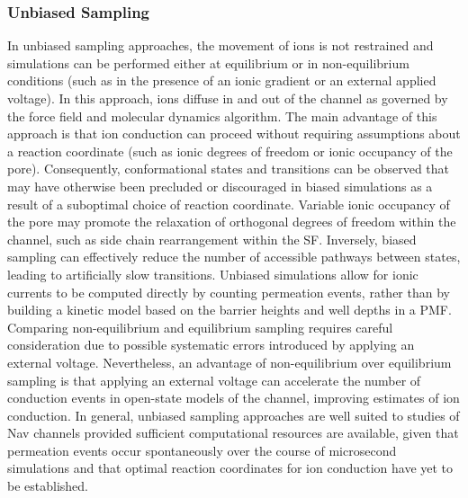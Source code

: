 \begin{refsection}
 \subsubsection{Unbiased Sampling}
 In unbiased sampling approaches, the movement of ions is not restrained and simulations can be performed either at equilibrium or in non-equilibrium conditions (such as in the presence of an ionic gradient or an external applied voltage).  In this approach, ions diffuse in and out of the channel as governed by the force field and molecular dynamics algorithm.  The main advantage of this approach is that ion conduction can proceed without requiring assumptions about a reaction coordinate (such as ionic degrees of freedom or ionic occupancy of the pore).  Consequently, conformational states and transitions can be observed that may have otherwise been precluded or discouraged in biased simulations as a result of a suboptimal choice of reaction coordinate.  Variable ionic occupancy of the pore may promote the relaxation of orthogonal degrees of freedom within the channel, such as side chain rearrangement within the SF.  Inversely, biased sampling can effectively reduce the number of accessible pathways between states, leading to artificially slow transitions.  Unbiased simulations allow for ionic currents to be computed directly by counting permeation events, rather than by building a kinetic model based on the barrier heights and well depths in a PMF.  Comparing non-equilibrium and equilibrium sampling requires careful consideration due to possible systematic errors introduced by applying an external voltage.  Nevertheless, an advantage of non-equilibrium over equilibrium sampling is that applying an external voltage can accelerate the number of conduction events in open-state models of the channel, improving estimates of ion conduction.  In general, unbiased sampling approaches are well suited to studies of Nav channels provided sufficient computational resources are available, given that permeation events occur spontaneously over the course of microsecond simulations and that optimal reaction coordinates for ion conduction have yet to be established.
 

\end{refsection}
